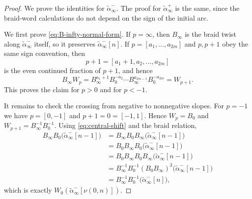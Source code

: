 \documentclass[11pt,a4paper,reqno]{amsart}%
\theoremstyle{plain}
\theoremstyle{definition}
\numberwithin{equation}{section}
\numberwithin{equation}{section}
\begin{document}
\begin{proof}
We prove the identities for $\widetilde{\alpha}_\infty^-$. The proof for
$\widetilde{\alpha}_\infty^+$ is the same, since the braid-word calculations do
not depend on the sign of the initial arc.

We first prove \eqref{eq:B-infty-normal-form}. If $p=\infty$, then $B_\infty$
is the braid twist along $\widetilde{\alpha}_\infty^-$ itself, so it preserves
$\widetilde{\alpha}_\infty^-[n]$. If $p=[a_1,\ldots,a_{2m}]$ and $p,p+1$ obey
the same sign convention, then
\[
p+1=[a_1+1,a_2,\ldots,a_{2m}]
\]
is the even continued fraction of $p+1$, and hence
\[
B_\infty W_p
=B_\infty^{a_1+1}B_0^{-a_2}\cdots B_\infty^{a_{2m-1}}B_0^{-a_{2m}}
=W_{p+1}.
\]
This proves the claim for $p>0$ and for $p<-1$.

It remains to check the crossing from negative to nonnegative slopes. For
$p=-1$ we have $p=[0,-1]$ and $p+1=0=[-1,1]$. Hence
$W_p=B_0$ and $W_{p+1}=B_\infty^{-1}B_0^{-1}$. Using
\eqref{eq:central-shift} and the braid relation,
\[
\begin{aligned}
B_\infty B_0\bigl(\widetilde{\alpha}_\infty^-[n-1]\bigr)
&=B_\infty B_0B_\infty\bigl(\widetilde{\alpha}_\infty^-[n-1]\bigr)\\
&=B_0B_\infty B_0\bigl(\widetilde{\alpha}_\infty^-[n-1]\bigr)\\
&=B_0B_\infty B_0B_\infty\bigl(\widetilde{\alpha}_\infty^-[n-1]\bigr)\\
&=B_\infty^{-1}B_0^{-1}(B_0B_\infty)^3
\bigl(\widetilde{\alpha}_\infty^-[n-1]\bigr)\\
&=B_\infty^{-1}B_0^{-1}\bigl(\widetilde{\alpha}_\infty^-[n]\bigr),
\end{aligned}
\]
which is exactly
$W_0(\widetilde{\alpha}_\infty^-[\nu(0,n)])$.


\end{proof}
\end{document}
